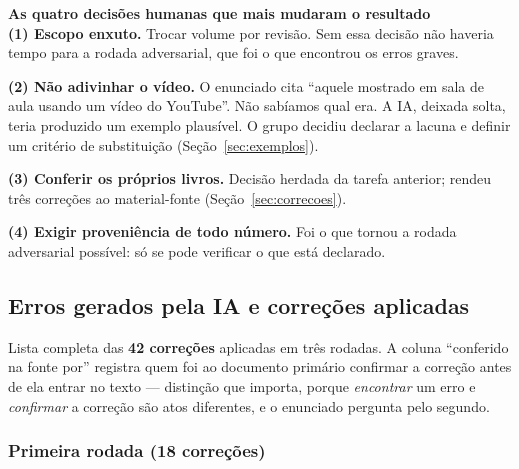 \documentclass[11pt,a4paper]{article}
\newcommand{\destaque}[2]{%
  \begin{center}\begin{minipage}{0.96\textwidth}
  \colorbox{fundo}{\begin{minipage}{\dimexpr\linewidth-2\fboxsep}
  \vspace{2pt}\textbf{\color{azul}\small #1}\\[1pt]\footnotesize #2\vspace{3pt}
  \end{minipage}}\end{minipage}\end{center}}
\begin{document}
\destaque{As quatro decisões humanas que mais mudaram o resultado}{%
\textbf{(1) Escopo enxuto.} Trocar volume por revisão. Sem essa decisão não haveria tempo para a
rodada adversarial, que foi o que encontrou os erros graves.

\smallskip
\textbf{(2) Não adivinhar o vídeo.} O enunciado cita ``aquele mostrado em sala de aula usando um
vídeo do YouTube''. Não sabíamos qual era. A IA, deixada solta, teria produzido um exemplo
plausível. O grupo decidiu declarar a lacuna e definir um critério de substituição
(Seção~\ref{sec:exemplos}).

\smallskip
\textbf{(3) Conferir os próprios livros.} Decisão herdada da tarefa anterior; rendeu três correções
ao material-fonte (Seção~\ref{sec:correcoes}).

\smallskip
\textbf{(4) Exigir proveniência de todo número.} Foi o que tornou a rodada adversarial possível:
só se pode verificar o que está declarado.}

\subsection{Erros gerados pela IA e correções aplicadas}
\label{sec:erros}

Lista completa das \textbf{42 correções} aplicadas em três rodadas. A coluna ``conferido na fonte
por'' registra quem foi ao documento primário confirmar a correção antes de ela entrar no texto ---
distinção que importa, porque \emph{encontrar} um erro e \emph{confirmar} a correção são atos
diferentes, e o enunciado pergunta pelo segundo.

\subsubsection*{Primeira rodada (18 correções)}
\end{document}
